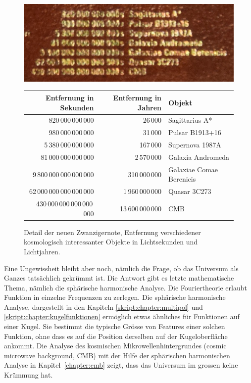\begin{figure}
\begin{center}
\includegraphics[width=0.7\hsize]{chapters/images/notendetail2.jpg}
\medskip

\begin{tabular}{|r|r|l|}
\hline
 Entfernung in Sekunden  &Entfernung in Jahren&Objekt                  \\
\hline
          820\,000\,000\,000&          26\,000&Sagittarius A*          \\
          980\,000\,000\,000&          31\,000&Pulsar B1913+16         \\
       5\,380\,000\,000\,000&         167\,000&Supernova 1987A         \\
      81\,000\,000\,000\,000&      2\,570\,000&Galaxia Andromeda       \\
  9\,800\,000\,000\,000\,000&    310\,000\,000&Galaxiae Comae Berenicis\\
 62\,000\,000\,000\,000\,000& 1\,960\,000\,000&Quasar 3C273            \\
430\,000\,000\,000\,000\,000&13\,600\,000\,000&CMB                     \\
\hline
\end{tabular}
\end{center}
\caption{Detail der neuen Zwanzigernote, Entfernung verschiedener
kosmologisch interessanter Objekte in Lichtsekunden und Lichtjahren.
\label{skript:einleitung:detail}}
\end{figure}


Eine Ungewissheit bleibt aber noch, nämlich die Frage, ob das
Universum als Ganzes tatsächlich gekrümmt ist.
Die Antwort gibt es letzte mathematische Thema, nämlich die
sphärische harmonische Analyse.
Die Fouriertheorie erlaubt Funktion in einzelne Frequenzen zu
zerlegen.
Die sphärische harmonische Analyse, dargestellt in den Kapiteln
\ref{skript:chapter:multipol} und \ref{skript:chapter:kugelfunktionen}
ermöglich etwas ähnliches für Funktionen auf einer Kugel. 
Sie bestimmt die typische Grösse von Features einer solchen
Funktion, ohne dass es auf die Position derselben auf der Kugeloberfläche
ankommt.
Die Analyse des kosmischen Mikrowellenhintergrundes (cosmic microwave
background, CMB) mit der Hilfe der sphärischen harmonischen Analyse
in Kapitel~\ref{chapter:cmb} zeigt, dass das Universum im grossen
keine Krümmung hat.

